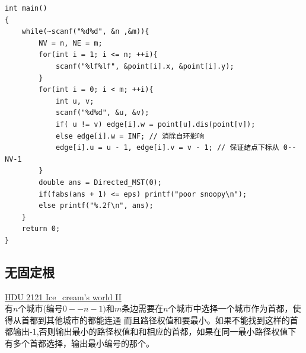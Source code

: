 \begin{lstlisting}
int main()
{
    while(~scanf("%d%d", &n ,&m)){
        NV = n, NE = m;
        for(int i = 1; i <= n; ++i){
            scanf("%lf%lf", &point[i].x, &point[i].y);
        }
        for(int i = 0; i < m; ++i){
            int u, v;
            scanf("%d%d", &u, &v);
            if( u != v) edge[i].w = point[u].dis(point[v]);
            else edge[i].w = INF; // 消除自环影响
            edge[i].u = u - 1, edge[i].v = v - 1; // 保证结点下标从 0--NV-1
        }
        double ans = Directed_MST(0);
        if(fabs(ans + 1) <= eps) printf("poor snoopy\n");
        else printf("%.2f\n", ans);
    }
    return 0;
}
\end{lstlisting}

\subsection{无固定根}
\underline {HDU 2121 Ice\_cream’s world II}\\

有$n$个城市(编号$0--n-1)$和$m$条边需要在$n$个城市中选择一个城市作为首都，使得从首都到其他城市的都能连通 而且路径权值和要最小。如果不能找到这样的首都输出-1,否则输出最小的路径权值和和相应的首都，如果在同一最小路径权值下有多个首都选择，输出最小编号的那个。 \\

